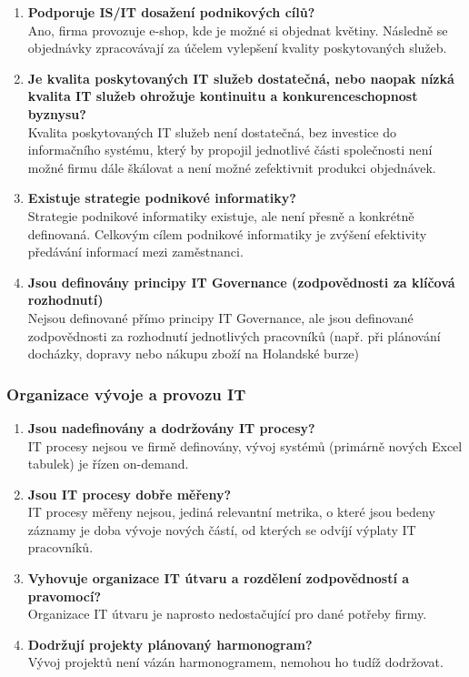 \documentclass{article}
\begin{document}
\begin{enumerate}
    \item \textbf{Podporuje IS/IT dosažení podnikových cílů?} \\
         Ano, firma provozuje e-shop, kde je možné si objednat květiny.
         Následně se objednávky zpracovávají za účelem vylepšení kvality poskytovaných služeb.

    \item \textbf{Je kvalita poskytovaných IT služeb dostatečná, nebo naopak nízká kvalita IT služeb ohrožuje kontinuitu a konkurenceschopnost byznysu?} \\
        Kvalita poskytovaných IT služeb není dostatečná, bez investice do informačního systému,
        který by propojil jednotlivé části společnosti není možné firmu dále škálovat a není možné
        zefektivnit produkci objednávek.


    \item \textbf{Existuje strategie podnikové informatiky?} \\
        Strategie podnikové informatiky existuje, ale není přesně a konkrétně definovaná.
        Celkovým cílem podnikové informatiky je zvýšení efektivity předávání informací mezi zaměstnanci.

    \item \textbf{Jsou definovány principy IT Governance (zodpovědnosti za klíčová rozhodnutí)} \\
        Nejsou definované přímo principy IT Governance, ale jsou definované zodpovědnosti za rozhodnutí jednotlivých pracovníků (např. při plánování docházky, dopravy nebo nákupu zboží na Holandské burze)


\end{enumerate}

\subsubsection*{Organizace vývoje a provozu IT}

\begin{enumerate}
    \item \textbf{Jsou nadefinovány a dodržovány IT procesy?} \\
        IT procesy nejsou ve firmě definovány, vývoj systémů (primárně nových Excel tabulek) je řízen on-demand.

    \item \textbf{Jsou IT procesy dobře měřeny?} \\
        IT procesy měřeny nejsou, jediná relevantní metrika, o které jsou bedeny záznamy je doba vývoje nových částí, od kterých se odvíjí výplaty IT pracovníků.

    \item \textbf{Vyhovuje organizace IT útvaru a rozdělení zodpovědností a pravomocí?} \\
        Organizace IT útvaru je naprosto nedostačující pro dané potřeby firmy.

    \item \textbf{Dodržují projekty plánovaný harmonogram?} \\
        Vývoj projektů není vázán harmonogramem, nemohou ho tudíž dodržovat.
\end{enumerate}
\end{document}

